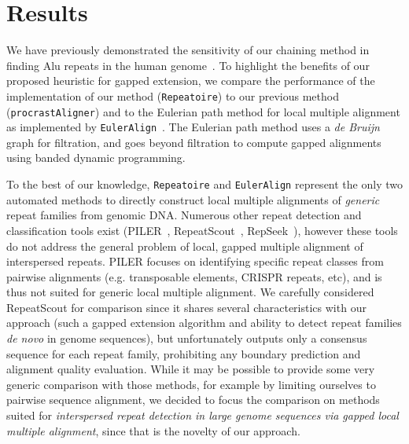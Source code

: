 \documentclass[12pt,journal,letterpaper,onecolumn, draftcls]{IEEEtran}
\begin{document}
\section{Results}
We have previously demonstrated the sensitivity of our chaining method
in finding Alu repeats in the human
genome~\cite{ref-procrast}. To highlight the benefits of our proposed
heuristic for gapped extension, we compare the performance of the implementation of our method (\texttt{Repeatoire}) to our previous method (\texttt{procrastAligner}) and to the Eulerian path method for local multiple alignment
as implemented by \texttt{EulerAlign}~\cite{ref-related1}. The Eulerian
path method uses a \textit{de Bruijn} graph for filtration, and goes
beyond filtration to compute gapped alignments using banded dynamic
programming.

To the best of our knowledge, \texttt{Repeatoire} and
\texttt{EulerAlign} represent the only two automated methods to directly
construct local multiple alignments of \emph{generic} repeat families from genomic DNA.
Numerous other repeat detection and classification tools exist (PILER~\cite{ref-piler}, RepeatScout~\cite{repeatscout}, RepSeek~\cite{repseek}), however these tools do not address the general problem of local, gapped multiple alignment of interspersed repeats.  PILER focuses on identifying specific repeat classes from pairwise alignments (e.g. transposable elements, CRISPR repeats, etc), and is thus not suited for generic local multiple alignment. We carefully considered RepeatScout for comparison since it shares several characteristics with our approach (such a gapped extension algorithm and ability to detect repeat families \emph{de novo} in genome sequences), but unfortunately outputs only a consensus sequence for each repeat family, prohibiting any boundary prediction and alignment quality evaluation.  While it may be possible to provide some very generic comparison with those methods, for example by limiting ourselves to pairwise sequence alignment, we decided to focus the comparison on methods suited for \emph{interspersed repeat detection in large genome sequences via gapped local multiple alignment}, since that is the novelty of our approach.
\end{document}
